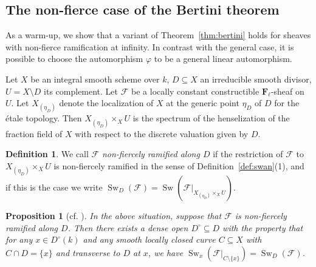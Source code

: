 \documentclass[twoside]{amsart}
\newcommand{\FF}{\mathbf{F}}
\newcommand{\Ff}{\mathscr{F}}
\DeclareMathOperator{\Swan}{Sw}
\renewcommand{\phi}{\varphi}
\theoremstyle{plain}
\newtheorem{proposition}[subsubsection]{Proposition}
\theoremstyle{definition}
\newtheorem{definition}[subsubsection]{Definition}
\theoremstyle{remark}
\numberwithin{equation}{subsection}
\begin{document}
\subsection{The non-fierce case of the Bertini theorem}
\label{ss:non-fierce}

As a warm-up, we show that a variant of Theorem~\ref{thm:bertini} holds for sheaves with non-fierce ramification at infinity. In contrast with the general case, it is possible to choose the automorphism $\phi$ to be a general linear automorphism.

Let $X$ be an integral smooth scheme over $k$, $D\subseteq X$ an irreducible smooth divisor, $U=X\setminus D$ its complement. Let $\Ff$ be a locally constant constructible $\FF_\ell$-sheaf on $U$. Let $X_{(\eta_D)}$ denote the localization of $X$ at the generic point $\eta_D$ of $D$ for the \'etale topology. Then $X_{(\eta_D)}\times_X U$ is the spectrum of the henselization of the fraction field of $X$ with respect to the discrete valuation given by $D$.

\begin{definition} \label{def:nonfierce-sheaf}
	We call $\Ff$ \emph{non-fiercely ramified along $D$} if the restriction of $\Ff$ to $X_{(\eta_D)}\times_X U$ is non-fiercely ramified in the sense of Definition~\ref{def:swan}(1), and if this is the case we write $\Swan_D(\Ff) = \Swan(\Ff|_{X_{(\eta_D)}\times_X U})$. 
\end{definition}

\begin{proposition}[{cf. \cite[\S 2.2]{LaumonSurface}}] \label{prop:nonfierce-is-nice}
	In the above situation, suppose that $\Ff$ is non-fiercely ramified along $D$. Then there exists a dense open $D^\circ \subseteq D$ with the property that for any $x\in D^\circ(k)$ and any smooth locally closed curve $C\subseteq X$ with $C\cap D = \{x\}$ and transverse to $D$ at $x$, we have $\Swan_x(\Ff|_{C\setminus \{x\}}) = \Swan_D(\Ff)$.
\end{proposition}
\end{document}
